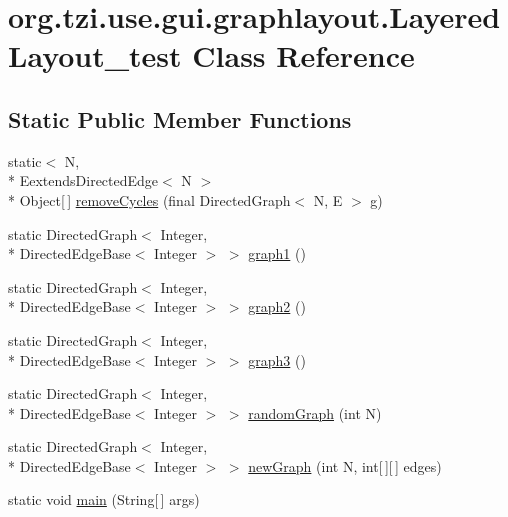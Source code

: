 \hypertarget{classorg_1_1tzi_1_1use_1_1gui_1_1graphlayout_1_1_layered_layout__test}{\section{org.\-tzi.\-use.\-gui.\-graphlayout.\-Layered\-Layout\-\_\-test Class Reference}
\label{classorg_1_1tzi_1_1use_1_1gui_1_1graphlayout_1_1_layered_layout__test}
}
\subsection*{Static Public Member Functions}
\begin{DoxyCompactItemize}
\item 
static$<$ N, \\*
Eextends\-Directed\-Edge$<$ N $>$\\*
 Object\mbox{[}$\,$\mbox{]} \hyperlink{classorg_1_1tzi_1_1use_1_1gui_1_1graphlayout_1_1_layered_layout__test_aee691abc4e4ce101cc9c038c86d70896}{remove\-Cycles} (final Directed\-Graph$<$ N, E $>$ g)
\item 
static Directed\-Graph$<$ Integer, \\*
Directed\-Edge\-Base$<$ Integer $>$ $>$ \hyperlink{classorg_1_1tzi_1_1use_1_1gui_1_1graphlayout_1_1_layered_layout__test_a9d2647bae78f9336342b92d8bb670887}{graph1} ()
\item 
static Directed\-Graph$<$ Integer, \\*
Directed\-Edge\-Base$<$ Integer $>$ $>$ \hyperlink{classorg_1_1tzi_1_1use_1_1gui_1_1graphlayout_1_1_layered_layout__test_a536ce8d329d654c7ad2469198d083fa5}{graph2} ()
\item 
static Directed\-Graph$<$ Integer, \\*
Directed\-Edge\-Base$<$ Integer $>$ $>$ \hyperlink{classorg_1_1tzi_1_1use_1_1gui_1_1graphlayout_1_1_layered_layout__test_a1abaa1946d55b152a831f1e48999c856}{graph3} ()
\item 
static Directed\-Graph$<$ Integer, \\*
Directed\-Edge\-Base$<$ Integer $>$ $>$ \hyperlink{classorg_1_1tzi_1_1use_1_1gui_1_1graphlayout_1_1_layered_layout__test_a5715bb09e2538eeb9614c45858ae6e09}{random\-Graph} (int N)
\item 
static Directed\-Graph$<$ Integer, \\*
Directed\-Edge\-Base$<$ Integer $>$ $>$ \hyperlink{classorg_1_1tzi_1_1use_1_1gui_1_1graphlayout_1_1_layered_layout__test_a5d071910ca2c7e76f7cad465fcb8ab4d}{new\-Graph} (int N, int\mbox{[}$\,$\mbox{]}\mbox{[}$\,$\mbox{]} edges)
\item 
static void \hyperlink{classorg_1_1tzi_1_1use_1_1gui_1_1graphlayout_1_1_layered_layout__test_a1e08956d4b843e80e821ec28598d2d71}{main} (String\mbox{[}$\,$\mbox{]} args)
\end{DoxyCompactItemize}



